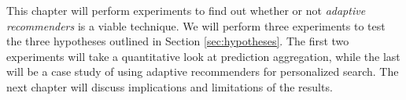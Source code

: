 \label{chap:results}

This chapter will perform experiments to find out whether or not
\emph{adaptive recommenders} is a viable technique.
We will perform three experiments to 
test the three hypotheses outlined in Section 
\ref{sec:hypotheses}.
The first two experiments will take a quantitative look
at prediction aggregation, while the last 
will be a case study of using adaptive recommenders
for personalized search.
The next chapter will discuss implications 
and limitations of the results.







%

